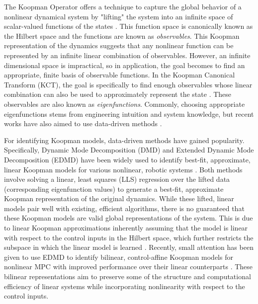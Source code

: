 \documentclass[letterpaper, 10 pt, conference]{ieeeconf}  %
\begin{document}
The Koopman Operator offers a technique to capture the global behavior of a nonlinear dynamical system by "lifting" the system into an infinite space of scalar-valued functions of the states \cite{1}. This function space is canonically known as the Hilbert space and the functions are known as \emph{observables}. This Koopman representation of the dynamics suggests that any nonlinear function can be represented by an infinite linear combination of observables. However, an infinite dimensional space is impractical, so in application, the goal becomes to find an appropriate, finite basis of observable functions. In the Koopman Canonical Transform (KCT), the goal is specifically to find enough observables whose linear combination can also be used to approximately represent the state \cite{2}. These observables are also known as \emph{eigenfunctions}. Commonly, choosing appropriate eigenfunctions stems from engineering intuition and system knowledge, but recent works have also aimed to use data-driven methods \cite{3}.

For identifying Koopman models, data-driven methods have gained popularity. Specifically, Dynamic Mode Decomposition (DMD) and Extended Dynamic Mode Decomposition (EDMD) have been widely used to identify best-fit, approximate, linear Koopman models for various nonlinear, robotic systems \cite{4, 5, 6, 7, 8}. Both methods involve solving a linear, least squares (LLS) regression over the lifted data (corresponding eigenfunction values) to generate a best-fit, approximate Koopman representation of the original dynamics. While these lifted, linear models pair well with existing, efficient algorithms, there is no guaranteed that these Koopman models are valid global representations of the system. This is due to linear Koopman approximations inherently assuming that the model is linear with respect to the control inputs in the Hilbert space, which further restricts the subspace in which the linear model is learned \cite{9}. Recently, small attention has been given to use EDMD to identify bilinear, control-affine Koopman models for nonlinear MPC with improved performance over their linear counterparts \cite{10, 11}. These bilinear representations aim to preserve some of the structure and computational efficiency of linear systems while incorporating nonlinearity with respect to the control inputs.
\end{document}
